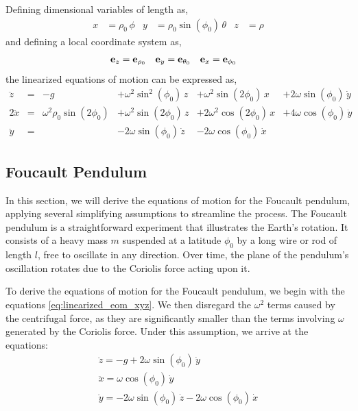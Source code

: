 \documentclass[12pt]{article}
\begin{document}
Defining dimensional variables of length as,
\begin{align}
  x &= \rho_0\,\phi & y &= \rho_0\sin(\phi_0)\,\theta & z &= \rho
\end{align}
and defining a local coordinate system as,
\begin{align}
  \vb{e}_z &= \vb{e}_{\rho_0} &
  \vb{e}_y &= \vb{e}_{\theta_0} &
  \vb{e}_x &= \vb{e}_{\phi_0}
\end{align}
the linearized equations of motion can be expressed as,
\begin{equation}
  \begin{alignedat}{6}
    \ddot{z} &=& -g
      &+\omega^2\sin^2(\phi_0)\,z
      &+\omega^2\sin(2\phi_0)\,x
      &+2\omega\sin(\phi_0)\,\dot{y} \\
    2\ddot{x} &=& \omega^2\rho_0\sin(2\phi_0)
      &+\omega^2\sin(2\phi_0)\,z
      &+2\omega^2\cos(2\phi_0)\,x
      &+4\omega\cos(\phi_0)\,\dot{y} \\
    \ddot{y} &=&
      &-2\omega\sin(\phi_0)\,\dot{z}
      &-2\omega\cos(\phi_0)\,\dot{x}
  \end{alignedat}
  \label{eq:linearized_eom_xyz}
\end{equation}

\subsection{Foucault Pendulum}

In this section, we will derive the equations of motion for the Foucault pendulum, applying
several simplifying assumptions to streamline the process. The Foucault pendulum is a
straightforward experiment that illustrates the Earth's rotation. It consists of a heavy mass
$m$ suspended at a latitude $\phi_0$ by a long wire or rod of length $l$, free to oscillate
in any direction. Over time, the plane of the pendulum's oscillation rotates due to the
Coriolis force acting upon it.

To derive the equations of motion for the Foucault pendulum, we begin with the equations
\eqref{eq:linearized_eom_xyz}. We then disregard the $\omega^2$ terms caused by the
centrifugal force, as they are significantly smaller than the terms involving $\omega$
generated by the Coriolis force. Under this assumption, we arrive at the equations:
\begin{equation}
  \begin{gathered}
    \ddot{z} = -g + 2\omega\sin(\phi_0)\,\dot{y} \\
    \ddot{x} = \omega\cos(\phi_0)\,\dot{y} \\
    \ddot{y} = -2\omega\sin(\phi_0)\,\dot{z} - 2\omega\cos(\phi_0)\,\dot{x}
  \end{gathered}
\end{equation}
\end{document}
